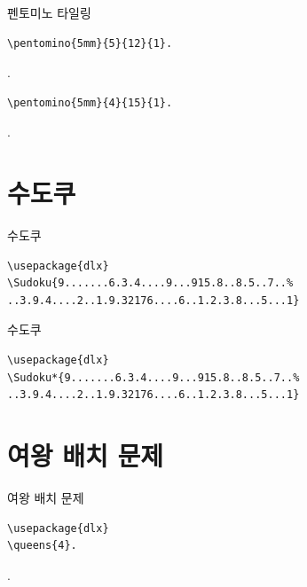 \documentclass[xcolor=svgnames]{beamer}
\begin{document}
%
\begin{frame}[fragile]{펜토미노 타일링}
\begin{verbatim}
\pentomino{5mm}{5}{12}{1}.
\end{verbatim}
\vspace{-5mm}
.
\vspace{-5mm}
\begin{verbatim}
\pentomino{5mm}{4}{15}{1}.
\end{verbatim}
\vspace{-5mm}
.
\end{frame}


\section{수도쿠}

%
\begin{frame}[fragile]{수도쿠}
  \begin{Verbatim}[fontsize=\small]
\usepackage{dlx}
\Sudoku{9.......6.3.4....9...915.8..8.5..7..%
..3.9.4....2..1.9.32176....6..1.2.3.8...5...1}
\end{Verbatim}  
\begin{center}
\end{center}
\end{frame}

%
\begin{frame}[fragile]{수도쿠}
\begin{Verbatim}[fontsize=\small]
\usepackage{dlx}
\Sudoku*{9.......6.3.4....9...915.8..8.5..7..%
..3.9.4....2..1.9.32176....6..1.2.3.8...5...1}
\end{Verbatim}
\begin{center}
\end{center}
\end{frame}


\section{여왕 배치 문제}

%
\begin{frame}[fragile]{여왕 배치 문제}
\begin{verbatim}
\usepackage{dlx}
\queens{4}.
\end{verbatim}
\vspace{-10mm}
.
\end{frame}
\end{document}
